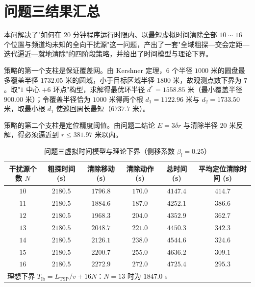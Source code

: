\documentclass[12pt,a4paper]{ctexart}
\begin{document}
\section{问题三结果汇总}

本问解决了"如何在 $20$ 分钟程序运行时限内、以最短虚拟时间清除全部 $10\sim16$ 个位置与频道均未知的全向干扰源"这一问题，产出了一套"全域粗探—交会定距—迭代逼近—就地清除"的四阶段策略，并给出了时间模型与理论下界。

策略的第一个支柱是保证覆盖网。由 Kershner 定理，$6$ 个半径 $1000$ 米的圆盘最多覆盖半径 $1732.05$ 米的圆域，小于目标区域半径 $1800$ 米，故观测点数下界为 $7$。取"$1$ 中心 $+ 6$ 环点"构型，求解得最优环半径 $d^{*}=1558.85$ 米（最小覆盖半径 $900.00$ 米）；令覆盖半径恰为 $1000$ 米得两个根 $d_1=1122.96$ 米与 $d_2=1733.50$ 米，取最小根 $d_1$ 使巡回周长最短（$6737.7$ 米）。

策略的第二个支柱是定位精度阈值。由问题二结论 $E=3\delta r$ 与清除半径 $20$ 米反解，得必须逼近到 $r\le381.97$ 米以内。

\begin{table}[H]
  \centering
  \caption{问题三虚拟时间模型与理论下界（侧移系数 $\beta_l=0.25$）}
  \label{tab:r3-time}
  \begin{tabular}{cccccc}
    \toprule
    干扰源个数 $N$ & 粗探时间 (s) & 清除移动 (s) & 清除动作 (s) & 总时间 (s) & 平均定位清除时间 (s) \\
    \midrule
    $10$ & $2180.5$ & $1796.8$ & $170.0$ & $4147.4$ & $414.7$ \\
    $11$ & $2180.5$ & $1884.6$ & $187.0$ & $4252.1$ & $386.6$ \\
    $12$ & $2180.5$ & $1968.3$ & $204.0$ & $4352.9$ & $362.7$ \\
    $13$ & $2180.5$ & $2048.7$ & $221.0$ & $4450.3$ & $342.3$ \\
    $14$ & $2180.5$ & $2126.1$ & $238.0$ & $4544.6$ & $324.6$ \\
    $15$ & $2180.5$ & $2200.7$ & $255.0$ & $4636.2$ & $309.1$ \\
    $16$ & $2180.5$ & $2272.9$ & $272.0$ & $4725.4$ & $295.3$ \\
    \midrule
    \multicolumn{6}{l}{理想下界 $T_{\mathrm{lb}}=L_{\mathrm{TSP}}/v+16N$：$N=13$ 时为 $1847.0$ s} \\
    \bottomrule
  \end{tabular}
\end{table}
\end{document}
